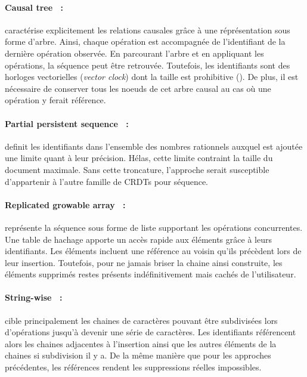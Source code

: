 \paragraph{Causal tree~\cite{grishchenko2010deep} :} caractérise explicitement
les relations causales grâce à une réprésentation sous forme d'arbre. Ainsi,
chaque opération est accompagnée de l'identifiant de la dernière opération
observée. En parcourant l'arbre et en appliquant les opérations, la séquence
peut être retrouvée. Toutefois, les identifiants sont des horloges vectorielles
(\emph{vector clock}) dont la taille est prohibitive (\REF). De plus, il est
nécessaire de conserver tous les noeuds de cet arbre causal au cas où une
opération y ferait référence.

\paragraph{Partial persistent sequence~\cite{wu2010partial} :} definit les
identifiants dans l'ensemble des nombres rationnels auxquel est ajoutée une
limite quant à leur précision. Hélas, cette limite contraint la taille du
document maximale. Sans cette troncature, l'approche serait susceptible
d'appartenir à l'autre famille de CRDTs pour séquence.

\paragraph{Replicated growable array~\cite{roh2011replicated} :} représente la
séquence sous forme de liste supportant les opérations concurrentes. Une table
de hachage apporte un accès rapide aux éléments grâce à leurs identifiants. Les
éléments incluent une référence au voisin qu'ils précèdent lors de leur
insertion. Toutefois, pour ne jamais briser la chaine ainsi construite, les
éléments supprimés restes présents indéfinitivement mais cachés de
l'utilisateur.

\paragraph{String-wise~\cite{yu2012stringwise} :} cible principalement les
chaines de caractères pouvant être subdivisées lors d'opérations jusqu'à devenir
une série de caractères. Les identifiants référencent alors les chaines
adjacentes à l'insertion ainsi que les autres éléments de la chaines si
subdivision il y a. De la même manière que pour les approches précédentes, les
références rendent les suppressions réelles impossibles.

